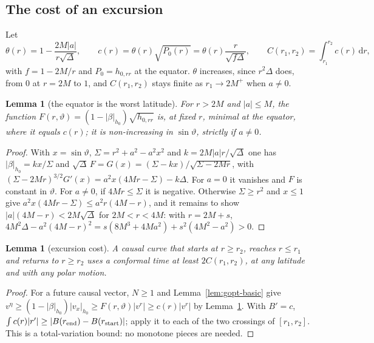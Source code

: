 \documentclass[aip,jmp,amsmath,amssymb,reprint]{revtex4-2}
\newcommand{\dd}{\mathrm{d}}
\theoremstyle{plain}
\newtheorem{lemma}[proposition]{Lemma}
\theoremstyle{definition}
\begin{document}
\subsection{The cost of an excursion}
Let
\begin{equation}
  \theta(r)=1-\frac{2M|a|}{r\sqrt\Delta},\qquad
  c(r)=\theta(r)\sqrt{P_0(r)}=\theta(r)\frac{r}{\sqrt{f\Delta}},\qquad
  C(r_1,r_2)=\int_{r_1}^{r_2}c(r)\,\dd r ,
  \label{eq:excursion}
\end{equation}
with $f=1-2M/r$ and $P_0=h_{0,rr}$ at the equator. $\theta$ increases, since $r^2\Delta$ does, from $0$ at $r=2M$ to
$1$, and $C(r_1,r_2)$ stays finite as $r_1\to2M^+$ when $a\neq0$.

\begin{lemma}[the equator is the worst latitude]\label{lem:worst}
For $r>2M$ and $|a|\le M$, the function $F(r,\vartheta)=(1-|\beta|_{h_0})\sqrt{h_{0,rr}}$ is,
at fixed $r$, minimal at the equator, where it equals $c(r)$; it is non-increasing in
$\sin\vartheta$, strictly if $a\ne0$.
\end{lemma}

\begin{proof}
With $x=\sin\vartheta$, $\Sigma=r^2+a^2-a^2x^2$ and $k=2M|a|r/\sqrt\Delta$ one has
$|\beta|_{h_0}=kx/\Sigma$ and $\sqrt\Delta\,F=G(x)=(\Sigma-kx)/\sqrt{\Sigma-2Mr}$, with
$(\Sigma-2Mr)^{3/2}G'(x)=a^2x(4Mr-\Sigma)-k\Delta$. For $a=0$ it vanishes and $F$ is constant in $\vartheta$. For $a\ne0$, if $4Mr\le\Sigma$ it is negative.
Otherwise $\Sigma\ge r^2$ and $x\le1$ give $a^2x(4Mr-\Sigma)\le a^2r(4M-r)$, and it remains to
show $|a|(4M-r)<2M\sqrt\Delta$ for $2M<r<4M$: with $r=2M+s$,
$4M^2\Delta-a^2(4M-r)^2=s(8M^3+4Ma^2)+s^2(4M^2-a^2)>0$.
\end{proof}

\begin{lemma}[excursion cost]\label{lem:excursion}
A causal curve that starts at $r\ge r_2$, reaches $r\le r_1$ and returns to $r\ge r_2$ uses a
conformal time at least $2C(r_1,r_2)$, at any latitude and with any polar motion.
\end{lemma}

\begin{proof}
For a future causal vector, $N\ge1$ and Lemma~\ref{lem:gopt-basic} give
$v^\eta\ge(1-|\beta|_{h_0})|v_x|_{h_0}\ge F(r,\vartheta)|v^r|\ge c(r)|v^r|$ by
Lemma~\ref{lem:worst}. With $B'=c$, $\int c(r)|r'|\ge|B(r_{\rm end})-B(r_{\rm start})|$; apply
it to each of the two crossings of $[r_1,r_2]$. This is a total-variation bound: no
monotone pieces are needed.
\end{proof}
\end{document}
